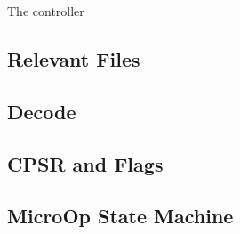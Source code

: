\label{sec:c}
The controller

\subsection{Relevant Files}

\subsection{Decode}

\subsection{CPSR and Flags}

\subsection{MicroOp State Machine}